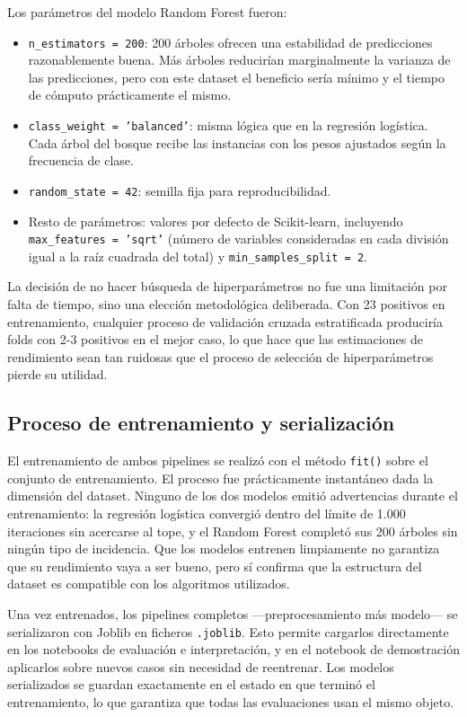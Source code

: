 \documentclass[12pt, a4paper, oneside]{report}
\begin{document}
Los parámetros del modelo Random Forest fueron:

\begin{itemize}
    \item \texttt{n\_estimators = 200}: 200 árboles ofrecen una estabilidad de predicciones razonablemente buena. Más árboles reducirían marginalmente la varianza de las predicciones, pero con este dataset el beneficio sería mínimo y el tiempo de cómputo prácticamente el mismo.
    \item \texttt{class\_weight = 'balanced'}: misma lógica que en la regresión logística. Cada árbol del bosque recibe las instancias con los pesos ajustados según la frecuencia de clase.
    \item \texttt{random\_state = 42}: semilla fija para reproducibilidad.
    \item Resto de parámetros: valores por defecto de Scikit-learn, incluyendo \texttt{max\_features = 'sqrt'} (número de variables consideradas en cada división igual a la raíz cuadrada del total) y \texttt{min\_samples\_split = 2}.
\end{itemize}

La decisión de no hacer búsqueda de hiperparámetros no fue una limitación por falta de tiempo, sino una elección metodológica deliberada. Con 23 positivos en entrenamiento, cualquier proceso de validación cruzada estratificada produciría folds con 2-3 positivos en el mejor caso, lo que hace que las estimaciones de rendimiento sean tan ruidosas que el proceso de selección de hiperparámetros pierde su utilidad.

\subsection{Proceso de entrenamiento y serialización}

El entrenamiento de ambos pipelines se realizó con el método \texttt{fit()} sobre el conjunto de entrenamiento. El proceso fue prácticamente instantáneo dada la dimensión del dataset. Ninguno de los dos modelos emitió advertencias durante el entrenamiento: la regresión logística convergió dentro del límite de 1.000 iteraciones sin acercarse al tope, y el Random Forest completó sus 200 árboles sin ningún tipo de incidencia. Que los modelos entrenen limpiamente no garantiza que su rendimiento vaya a ser bueno, pero sí confirma que la estructura del dataset es compatible con los algoritmos utilizados.

Una vez entrenados, los pipelines completos —preprocesamiento más modelo— se serializaron con Joblib en ficheros \texttt{.joblib}. Esto permite cargarlos directamente en los notebooks de evaluación e interpretación, y en el notebook de demostración aplicarlos sobre nuevos casos sin necesidad de reentrenar. Los modelos serializados se guardan exactamente en el estado en que terminó el entrenamiento, lo que garantiza que todas las evaluaciones usan el mismo objeto.
\end{document}

